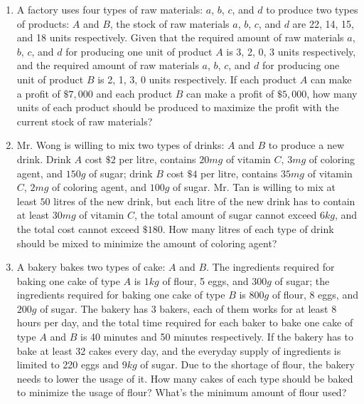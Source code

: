 \documentclass{report}
\begin{document}
\begin{multicols}{2}
\begin{enumerate}
        \item A factory uses four types of raw materials: $a$, $b$, $c$, and $d$ to produce
              two types of products: $A$ and $B$, the stock of raw materials $a$, $b$, $c$,
              and $d$ are 22, 14, 15, and 18 units respectively. Given that the required
              amount of raw materials $a$, $b$, $c$, and $d$ for producing one unit of
              product $A$ is 3, 2, 0, 3 units respectively, and the required amount of raw
              materials $a$, $b$, $c$, and $d$ for producing one unit of product $B$ is 2, 1,
              3, 0 units respectively. If each product $A$ can make a profit of $\$7,000$ and
              each product $B$ can make a profit of $\$5,000$, how many units of each product
              should be produced to maximize the profit with the current stock of raw
              materials?
        \item Mr. Wong is willing to mix two types of drinks: $A$ and $B$ to produce a new
              drink. Drink $A$ cost $\$2$ per litre, contains $20mg$ of vitamin $C$, $3mg$ of
              coloring agent, and $150g$ of sugar; drink $B$ cost $\$4$ per litre, contains
              $35mg$ of vitamin $C$, $2mg$ of coloring agent, and $100g$ of sugar. Mr. Tan is
              willing to mix at least $50$ litres of the new drink, but each litre of the new
              drink has to contain at least $30mg$ of vitamin $C$, the total amount of sugar
              cannot exceed $6kg$, and the total cost cannot exceed $\$180$. How many litres
              of each type of drink should be mixed to minimize the amount of coloring agent?

        \item A bakery bakes two types of cake: $A$ and $B$. The ingredients required for
              baking one cake of type $A$ is $1kg$ of flour, 5 eggs, and $300g$ of sugar; the
              ingredients required for baking one cake of type $B$ is $800g$ of flour, 8
              eggs, and $200g$ of sugar. The bakery has 3 bakers, each of them works for at
              least 8 hours per day, and the total time required for each baker to bake one
              cake of type $A$ and $B$ is 40 minutes and 50 minutes respectively. If the
              bakery has to bake at least 32 cakes every day, and the everyday supply of
              ingredients is limited to 220 eggs and $9kg$ of sugar. Due to the shortage of
              flour, the bakery needs to lower the usage of it. How many cakes of each type
              should be baked to minimize the usage of flour? What's the minimum amount of
              flour used?
    \end{enumerate}


\end{multicols}
\end{document}
